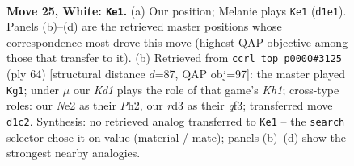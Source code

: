 \documentclass[11pt]{article}
\begin{document}
\clearpage

\begin{figure}[p]\centering
\begin{subfigure}{0.46\textwidth}\centering
\resizebox{\linewidth}{!}{%
\newchessgame
\chessboard[
  setfen={Q7/pp1n2kp/7p/1P1q2b1/3P2P1/3r1P2/4N3/R2K1B1R w - - 1 25},
  showmover=false,
  pgfstyle=straightmove, color=movearrow, markmove={d1-e1}
]}
\caption{}
\end{subfigure}\hfill
\begin{subfigure}{0.46\textwidth}\centering
\resizebox{\linewidth}{!}{%
\newchessgame
\chessboard[
  setfen={Q7/p3k1p1/np6/4bp2/1P2p3/P4q2/5P1P/2R1R2K w - - 2 33},
  showmover=false,
  pgfstyle=straightmove, color=movearrow, markmove={h1-g1}
]}
\caption{}
\end{subfigure}
\\[4pt]

\caption{\textbf{Move 25, White: \texttt{Ke1}.} (a) Our position; Melanie plays \texttt{Ke1} (\texttt{d1e1}). Panels (b)--(d) are the retrieved master positions whose correspondence most drove this move (highest QAP objective among those that transfer to it). (b) Retrieved from \texttt{ccrl\_top\_p0000\#3125} (ply 64) [structural distance $d$=87, QAP obj=97]: the master played \texttt{Kg1}; under $\mu$ our \emph{Kd1} plays the role of that game's \emph{Kh1}; cross-type roles: our \emph{N}e2 as their \emph{P}h2, our \emph{r}d3 as their \emph{q}f3; transferred move \texttt{d1c2}. Synthesis: no retrieved analog transferred to \texttt{Ke1} -- the \texttt{search} selector chose it on value (material / mate); panels (b)--(d) show the strongest nearby analogies.}
\label{fig:thought-m48}
\end{figure}

\clearpage
\end{document}
